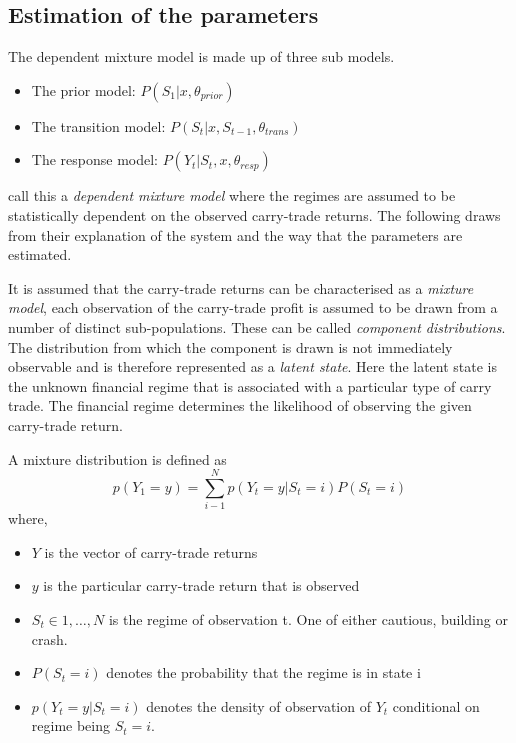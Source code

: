 \documentclass[12pt, a4paper, oneside]{article} %
\begin{document}
\subsection{Estimation of the parameters}
The dependent mixture model is made up of three sub models.  

\begin{itemize}
\item The prior model: $P(S_1|x, \theta_{prior})$
\item The transition model: $P(S_t|x, S_{t-1}, \theta_{trans})$
\item The response model: $P(Y_t| S_t, x, \theta_{resp})$
\end{itemize}


 \citet{depmixS4} call this a \emph{dependent mixture model} where the regimes are assumed to be statistically dependent on the observed carry-trade returns. The following draws from their explanation of the system and the way that the parameters are estimated.  

It is assumed that the carry-trade returns can be characterised as a \emph{mixture model}, each observation of the carry-trade profit is assumed to be drawn from a number of distinct sub-populations.  These can be called \emph{component distributions}.  The distribution from which the component is drawn is not immediately observable and is therefore represented as a \emph{latent state}.  Here the latent state is the unknown financial regime that is associated with a particular type of carry trade.  The financial regime determines the likelihood of observing the given carry-trade return. 

A mixture distribution is defined as 
\begin{equation}
p(Y_1 = y) = \sum_{i - 1}^N p(Y_t = y|S_t = i)P(S_t = i)
\end{equation}
where,
\begin{itemize}
\item $Y$ is the vector of carry-trade returns
\item $y$ is the particular carry-trade return that is observed
\item $S_t \in {1, \dots, N}$ is the regime of observation t.  One of either cautious, building or crash.
\item $P(S_t = i)$ denotes the probability that the regime is in state i 
\item $p(Y_t = y|S_t = i)$ denotes the density of observation of $Y_t$ conditional on regime being $S_t = i$.
\end{itemize}
\end{document}
